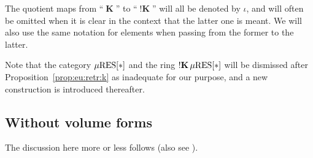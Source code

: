 \documentclass[12pt]{amsart}
\theoremstyle{plain}
\theoremstyle{definition}
\theoremstyle{remark}
\numberwithin{equation}{section}
\theoremstyle{plain}
\newcommand{\0}{\emptyset}
\newcommand{\RES}{\textup{RES}}
\newcommand{\mgRES}{{\mu}{\RES}}
\DeclareMathOperator{\ggk}{\mathbf{K}}
\DeclareMathOperator{\sggk}{!\mathbf{K}}
\begin{document}
The quotient maps from ``$\ggk$'' to ``$\sggk$'' will all be denoted by $\iota$, and will often be omitted when it is clear in the context that the latter one is meant. We will also use the same notation for elements when passing from the former to the latter.

Note that the category $\mgRES[*]$ and the ring $\sggk \mgRES[*]$  will be dismissed after Proposition~\ref{prop:eu:retr:k} as inadequate for our purpose, and a new construction is introduced thereafter.

\subsection{Without volume forms}\label{subs:uni:retr:novol}


The discussion here more or less follows \cite[\S~2.5]{hru:loe:lef} (also see \cite[Theorem~10.5]{hrushovski:kazhdan:integration:vf}).
\end{document}
